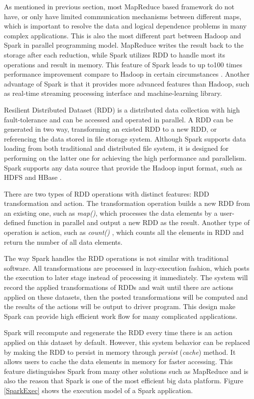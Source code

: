 As mentioned in previous section, most MapReduce based framework do not have, or only have limited communication mechanisms between different maps, which is important to resolve the data and logical dependence problems in many complex applications. This is also the most different part between Hadoop and Spark in parallel programming model. MapReduce writes the result back to the storage after each reduction, while Spark utilizes RDD to handle most its operations and result in memory. This feature of Spark leads to up to100 times performance improvement compare to Hadoop in certain circumstances \cite{ApacheSpark}. Another advantage of Spark is that it provides more advanced features than Hadoop, such as real-time streaming processing interface and machine-learning library.

Resilient Distributed Dataset (RDD) is a distributed data collection with high fault-tolerance and can be accessed and operated in parallel. A RDD can be generated in two way, transforming an existed RDD to a new RDD, or referencing the data stored in file storage system. Although Spark supports data loading from both traditional and distributed file system, it is designed for performing on the latter one for achieving the high performance and parallelism. Spark supports any data source that provide the Hadoop input format, such as HDFS and HBase \cite{ApacheSpark}.

There are two types of RDD operations with distinct features: RDD transformation and action. The transformation operation builds a new RDD from an existing one, such as \emph{map()}, which processes the data elements by a user-defined function in parallel and output a new RDD as the result. Another type of operation is action, such as \emph{count()} , which counts all the elements in RDD and return the number of all data elements. 

The way Spark handles the RDD operations is not similar with traditional software. All transformations are processed in lazy-execution fashion, which posts the execution to later stage instead of processing it immediately. The system will record the applied transformations of RDDs and wait until there are actions applied on these datasets, then the posted transformations will be computed and the results of the actions will be output to driver program. This design make Spark can provide high efficient work flow for many complicated applications. 

Spark will recompute and regenerate the RDD every time there is an action applied on this dataset by default. However, this system behavior can be replaced by making the RDD to persist in memory through \emph{persist} (\emph{cache}) method. It allows users to cache the data elements in memory for faster accessing. This feature distinguishes Spark from many other solutions such as MapReduce and is also the reason that Spark is one of the most efficient big data platform. Figure \ref{SparkExec} shows the execution model of a Spark application.

